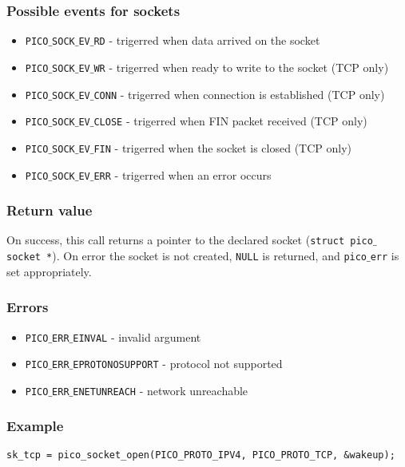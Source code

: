 \subsubsection*{Possible events for sockets}
\begin{itemize}[noitemsep]
\item \texttt{PICO$\_$SOCK$\_$EV$\_$RD} - trigerred when data arrived on the socket
\item \texttt{PICO$\_$SOCK$\_$EV$\_$WR} - trigerred when ready to write to the socket (TCP only)
\item \texttt{PICO$\_$SOCK$\_$EV$\_$CONN} - trigerred when connection is established (TCP only)
\item \texttt{PICO$\_$SOCK$\_$EV$\_$CLOSE} - trigerred when FIN packet received (TCP only)
\item \texttt{PICO$\_$SOCK$\_$EV$\_$FIN} - trigerred when the socket is closed (TCP only)
\item \texttt{PICO$\_$SOCK$\_$EV$\_$ERR} - trigerred when an error occurs
\end{itemize}

\subsubsection*{Return value}
On success, this call returns a pointer to the declared socket (\texttt{struct pico$\_$socket *}).
On error the socket is not created, \texttt{NULL} is returned, and \texttt{pico$\_$err} is set appropriately.

\subsubsection*{Errors}
\begin{itemize}[noitemsep]
\item \texttt{PICO$\_$ERR$\_$EINVAL} - invalid argument
\item \texttt{PICO$\_$ERR$\_$EPROTONOSUPPORT} - protocol not supported
\item \texttt{PICO$\_$ERR$\_$ENETUNREACH} - network unreachable 
\end{itemize}

\subsubsection*{Example}
\begin{verbatim}
sk_tcp = pico_socket_open(PICO_PROTO_IPV4, PICO_PROTO_TCP, &wakeup);
\end{verbatim}


